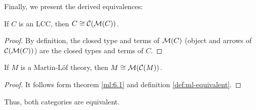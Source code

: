 
Finally, we present the derived equivalences:


\begin{theorem}\label{ml:6.1}
If $C$ is an LCC, then $C\cong \mathcal{C}(\mathcal{M}(C))$. 
\end{theorem}
\begin{proof}
  By definition, the closed type and terms of $\mathcal{M}(C)$ (object and arrows of $\mathcal{C}(\mathcal{M}(C))$)  are the closed types and terms of $C$.
\end{proof}

\begin{theorem}\label{ml:6.2}
If $M$ is a Martin-L\"of theory, then $M\cong \mathcal{M}(\mathcal{C}(M))$. 
\end{theorem}
\begin{proof}
It follows form theorem \ref{ml:6.1} and definition \ref{def:ml-equivalent}.
\end{proof}

Thus, both categories are equivalent.
